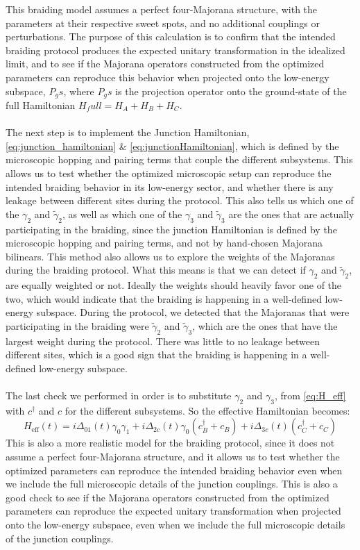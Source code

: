 This braiding model assumes a perfect four-Majorana structure, with the parameters at their respective sweet spots, and no additional couplings or perturbations. The purpose of this calculation is to confirm that the intended braiding protocol produces the expected unitary transformation in the idealized limit, and to see if the Majorana operators constructed from the optimized parameters can reproduce this behavior when projected onto the low-energy subspace, $P_gs$, where $P_gs$ is the projection operator onto the ground-state of the full Hamiltonian $H_full = H_A + H_B + H_C$. \\ \\ 
The next step is to implement the Junction Hamiltonian, \ref{eq:junction_hamiltonian} \& \ref{eq:junctionHamiltonian}, which is defined by the microscopic hopping and pairing terms that couple the different subsystems. This allows us to test whether the optimized microscopic setup can reproduce the intended braiding behavior in its low-energy sector, and whether there is any leakage between different sites during the protocol. This also tells us which one of the $γ_2$ and $\tilde{γ}_2$, as well as which one of the $γ_3$ and $\tilde{γ}_3$ are the ones that are actually participating in the braiding, since the junction Hamiltonian is defined by the microscopic hopping and pairing terms, and not by hand-chosen Majorana bilinears. This method also allows us to explore the weights of the Majoranas during the braiding protocol. What this means is that we can detect if $γ_2$ and $\tilde{γ}_2$, are equally weighted or not. Ideally the weights should heavily favor one of the two, which would indicate that the braiding is happening in a well-defined low-energy subspace. During the protocol, we detected that the Majoranas that were participating in the braiding were $\tilde{γ}_2$ and $\tilde{γ}_3$, which are the ones that have the largest weight during the protocol. There was little to no leakage between different sites, which is a good sign that the braiding is happening in a well-defined low-energy subspace.\\ \\ 
The last check we performed in order is to substitute $γ_2$ and $γ_3$, from \ref{eq:H_eff} with $c^\dagger$ and $c$ for the different subsystems. So the effective Hamiltonian becomes:
\begin{equation}
  H_{\text{eff}}(t)  = i Δ_{01}(t) γ_0 γ_1 + i Δ_{2c}(t) γ_0 ( c^\dagger_B +c_B) + i Δ_{3c}(t) (c^\dagger_C +c_C)
\end{equation}  
This is also a more realistic model for the braiding protocol, since it does not assume a perfect four-Majorana structure, and it allows us to test whether the optimized parameters can reproduce the intended braiding behavior even when we include the full microscopic details of the junction couplings. This is also a good check to see if the Majorana operators constructed from the optimized parameters can reproduce the expected unitary transformation when projected onto the low-energy subspace, even when we include the full microscopic details of the junction couplings.


